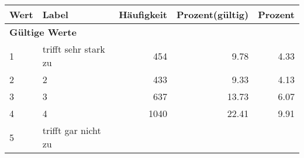      \begin{longtable}{lXrrr}
     \toprule
     \textbf{Wert} & \textbf{Label} & \textbf{Häufigkeit} & \textbf{Prozent(gültig)} & \textbf{Prozent} \\
     \endhead
     \midrule
     \multicolumn{5}{l}{\textbf{Gültige Werte}}\\

     1 &
     \multicolumn{1}{X}{ trifft sehr stark zu   } &


       \num{454} &
       \num[round-mode=places,round-precision=2]{9,78} &
         \num[round-mode=places,round-precision=2]{4,33} \\

     2 &
     \multicolumn{1}{X}{ 2   } &


       \num{433} &
       \num[round-mode=places,round-precision=2]{9,33} &
         \num[round-mode=places,round-precision=2]{4,13} \\

     3 &
     \multicolumn{1}{X}{ 3   } &


       \num{637} &
       \num[round-mode=places,round-precision=2]{13,73} &
         \num[round-mode=places,round-precision=2]{6,07} \\

     4 &
     \multicolumn{1}{X}{ 4   } &


       \num{1040} &
       \num[round-mode=places,round-precision=2]{22,41} &
         \num[round-mode=places,round-precision=2]{9,91} \\

     5 &
     \multicolumn{1}{X}{ trifft gar nicht zu   } &



\end{longtable}
